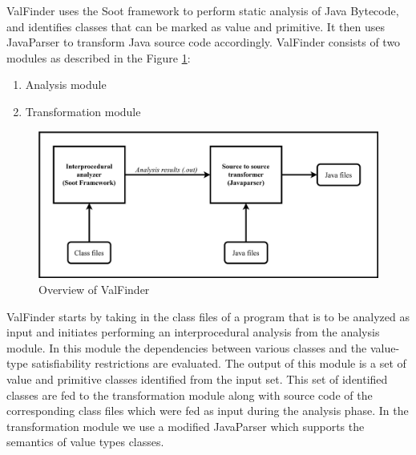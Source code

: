 \documentclass[12 pt, a4paper]{article}
\begin{document}
	

ValFinder uses the Soot framework \citep{soot} to perform static analysis
of Java Bytecode, and identifies classes that can be marked as value
and primitive. It then uses JavaParser \citep{JP} to transform Java source
code accordingly. ValFinder consists of two modules as described in the Figure \ref{fig:Figure 3}:
\begin{enumerate}
	\item Analysis module
	\item Transformation module
\end{enumerate}


\begin{figure}[h]
	\vskip 0.2cm
	\centering
	\includegraphics[scale=0.25]{Images/ValFinder.jpg}
	\caption{Overview of ValFinder}
	\label{fig:Figure 3}
\end{figure}


ValFinder starts by taking in the class files of a program that is to be analyzed as input and initiates performing an interprocedural
analysis from the analysis module.  In this module the dependencies between various
classes and the value-type satisfiability restrictions are evaluated. The output of this 
module is a set of value and primitive classes identified from the input set. This set of identified classes are fed to 
the transformation module along with source code of the corresponding class files which were fed 
as input during the analysis phase. In the transformation module we use a modified JavaParser which supports 
the semantics of value types classes. 

\clearpage
\end{document}
